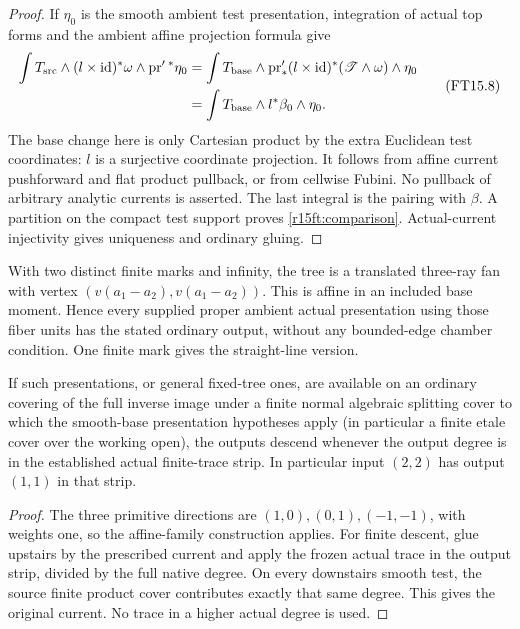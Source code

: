 \begin{proof}
If $\eta_0$ is the smooth ambient test presentation, integration
of actual top forms and the ambient affine projection formula give
\[
\begin{split}
 \int T_{\rm src}\wedge(l\times\mathrm{id})^*\omega
                                \wedge\operatorname{pr}'{}^*\eta_0
 &=\int T_{\rm base}\wedge
       \operatorname{pr}'_*(l\times\mathrm{id})^*
                       (\mathscr T\wedge\omega)\wedge\eta_0\\
 &=\int T_{\rm base}\wedge l^*\beta_0\wedge\eta_0.
\end{split}
\tag{FT15.8}\label{r15ft:refined-calculation}
\]
The base change here is only Cartesian product by the extra
Euclidean test coordinates: $l$ is a surjective coordinate
projection. It follows from affine current pushforward and flat
product pullback, or from cellwise Fubini. No pullback of arbitrary
analytic currents is asserted. The last integral is the pairing
with $\beta$. A partition on the compact test support proves
\eqref{r15ft:comparison}. Actual-current injectivity gives
uniqueness and ordinary gluing.
\end{proof}

\begin{corollary}
\label{r15ft:two-marks}
With two distinct finite marks and infinity, the tree is a
translated three-ray fan with vertex
$(v(a_1-a_2),v(a_1-a_2))$. This is affine in an included base
moment. Hence every supplied proper ambient actual presentation
using those fiber units has the stated ordinary output, without
any bounded-edge chamber condition. One finite mark gives the
straight-line version.

If such presentations, or general fixed-tree ones, are available
on an ordinary covering of the full inverse image under a finite
normal algebraic splitting cover to which the smooth-base presentation
hypotheses apply (in particular a finite etale cover over the working
open), the outputs descend whenever
the output degree is in the established actual finite-trace strip.
In particular input $(2,2)$ has output $(1,1)$ in that strip.
\end{corollary}

\begin{proof}
The three primitive directions are $(1,0),(0,1),(-1,-1)$, with
weights one, so the affine-family construction applies. For finite
descent, glue upstairs by the prescribed current and apply the
frozen actual trace in the output strip, divided by the full
native degree. On every downstairs smooth test, the source finite
product cover contributes exactly that same degree. This gives
the original current. No trace in a higher actual degree is used.
\end{proof}


